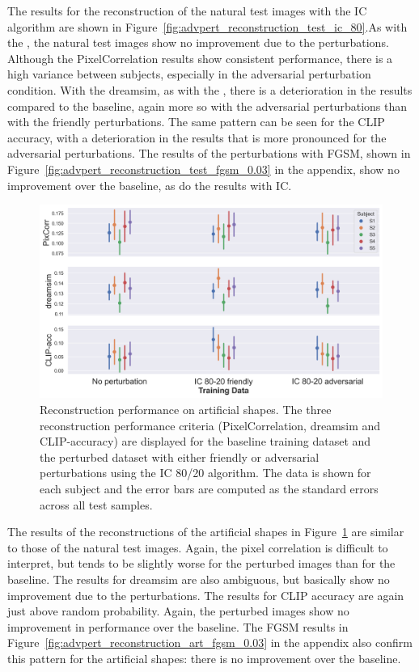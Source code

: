 The results for the reconstruction of the natural test images with the IC algorithm are shown in Figure~\ref{fig:advpert_reconstruction_test_ic_80}.As with the , the natural test images show no improvement due to the perturbations. Although the PixelCorrelation results show consistent performance, there is a high variance between subjects, especially in the adversarial perturbation condition. With the dreamsim, as with the , there is a deterioration in the results compared to the baseline, again more so with the adversarial perturbations than with the friendly perturbations. The same pattern can be seen for the CLIP accuracy, with a deterioration in the results that is more pronounced for the adversarial perturbations. The results of the perturbations with FGSM, shown in Figure~\ref{fig:advpert_reconstruction_test_fgsm_0.03} in the appendix, show no improvement over the baseline, as do the results with IC. 

\begin{figure}[ht]
    \centering
    \includegraphics[width=1\textwidth]{plots/advpert_reconstruction_art_ic_80-20.png}
    \caption[Experiment 3: Reconstruction performance on artificial shapes]{Reconstruction performance on artificial shapes. The three reconstruction performance criteria (PixelCorrelation, dreamsim and CLIP-accuracy) are displayed for the baseline training dataset and the perturbed dataset with either friendly or adversarial perturbations using the IC 80/20 algorithm. The data is shown for each subject and the error bars are computed as the standard errors across all test samples.}\label{fig:advpert_reconstruction_art_ic_80}
\end{figure}

The results of the reconstructions of the artificial shapes in Figure~\ref{fig:advpert_reconstruction_art_ic_80} are similar to those of the natural test images. Again, the pixel correlation is difficult to interpret, but tends to be slightly worse for the perturbed images than for the baseline. The results for dreamsim are also ambiguous, but basically show no improvement due to the perturbations. The results for CLIP accuracy are again just above random probability. Again, the perturbed images show no improvement in performance over the baseline. The FGSM results in Figure~\ref{fig:advpert_reconstruction_art_fgsm_0.03} in the appendix also confirm this pattern for the artificial shapes: there is no improvement over the baseline. 

